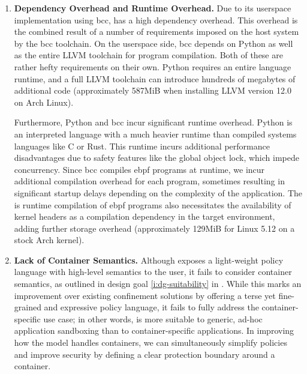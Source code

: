 \begin{enumerate}
  \item \textbf{Dependency Overhead and Runtime Overhead.}
    Due to its userspace implementation using bcc, \bpfbox{} has a high dependency
    overhead. This overhead is the combined result of a number of requirements imposed on
    the host system by the bcc toolchain. On the userspace side, bcc depends on Python as
    well as the entire LLVM toolchain for program compilation. Both of these are rather
    hefty requirements on their own. Python requires an entire language runtime, and
    a full LLVM toolchain can introduce hundreds of megabytes of additional code
    (approximately 587MiB when installing LLVM version 12.0 on Arch Linux).

    Furthermore, Python and bcc incur significant runtime overhead. Python is an
    interpreted language with a much heavier runtime than compiled systems languages like
    C or Rust.  This runtime incurs additional performance disadvantages due to safety
    features like the global object lock, which impede concurrency. Since bcc compiles
    \gls{ebpf} programs at runtime, we incur additional compilation overhead for each
    program, sometimes resulting in significant startup delays depending on the complexity
    of the application. The is runtime compilation of \gls{ebpf} programs also
    necessitates the availability of kernel headers as a compilation dependency in the
    target environment, adding further storage overhead (approximately 129MiB for Linux
    5.12 on a stock Arch kernel).

  \item \textbf{Lack of Container Semantics.}
    Although \bpfbox{} exposes a light-weight policy language with high-level semantics to
    the user, it fails to consider container semantics, as outlined in design goal
    \ref{i:dg-suitability} in . While this marks an improvement over
    existing confinement solutions by offering a terse yet fine-grained and expressive
    policy language, it fails to fully address the container-specific use case; in other
    words, \bpfbox{} is more suitable to generic, ad-hoc application sandboxing than to
    container-specific applications. In improving how the \bpfbox{} model handles
    containers, we can simultaneously simplify policies and improve security by defining
    a clear protection boundary around a container.


\end{enumerate}
